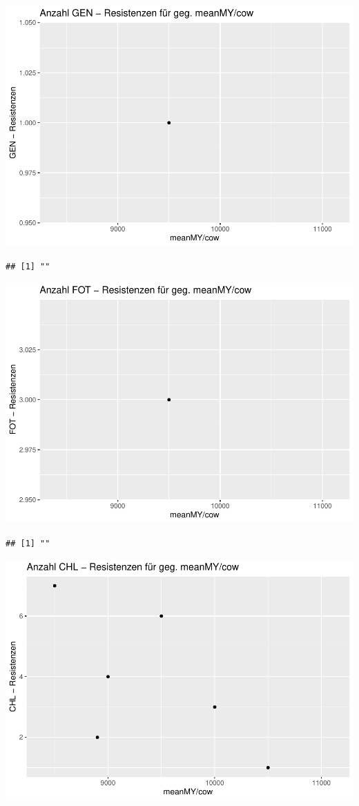 \documentclass[
]{article}
\begin{document}
\includegraphics{NResistenzen_files/figure-latex/unnamed-chunk-6-4.pdf}

\begin{verbatim}
## [1] ""
\end{verbatim}

\includegraphics{NResistenzen_files/figure-latex/unnamed-chunk-6-5.pdf}

\begin{verbatim}
## [1] ""
\end{verbatim}

\includegraphics{NResistenzen_files/figure-latex/unnamed-chunk-6-6.pdf}
\end{document}
